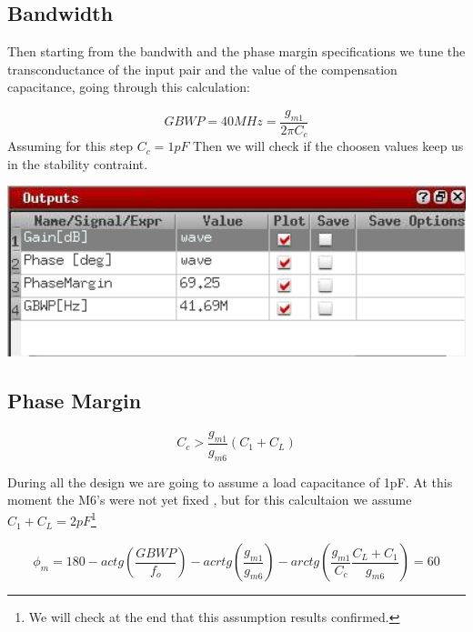 
\subsection{Bandwidth} %
\label{subsec:bandwidth}



Then starting from the bandwith and the phase margin specifications we tune the transconductance of the input pair and the value of the compensation capacitance, going through this calculation:

\begin{equation}
	GBWP=40MHz=\frac{g_{m1}}{2 \pi C_c}
\end{equation}
Assuming for this step $C_c = 1pF$
Then we will check if the choosen values keep us in the stability contraint.



\centering
\includegraphics[width=1\textwidth]{Capitoli/gainprimo.png}
\raggedright


\subsection{Phase Margin} %
\label{subsec:phase_margin}

\begin{equation}
	C_c> \frac{g_{m1}}{g_{m6}}(C_1+C_L)
\end{equation}

During all the design we are going to assume a load capacitance of 1pF.
At this moment the M6's were not yet fixed , but for this calcultaion we assume $C_1+C_L=2pF$\footnote{We will check at the end that this assumption results confirmed.}

\begin{equation}
	\phi_m=180- actg(\frac {GBWP} {f_o} )-acrtg(\frac { g_{m1} }{ g_{m6}})-arctg(\frac{g_{m1}} {C_c}\frac{C_L+C_1}{g_{m6}})=60 
\end{equation}

